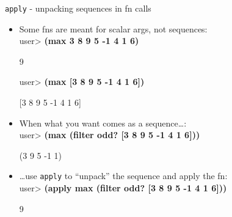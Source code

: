 \documentclass{beamer}
\begin{document}
\begin{frame}{\texttt{apply} - unpacking sequences in fn calls}
  \begin{itemize}
  \item Some fns are meant for scalar args, not sequences:\\
{\ttfamily\color{black}
%
\textcolor[rgb]{0.49803922,0.0,0.49803922}{user{\textgreater}
}\textbf{(max 3 8 9 5 -1 4 1 6)}}

{\ttfamily\color{black}
9}

{\ttfamily\color{black}
\textcolor[rgb]{0.49803922,0.0,0.49803922}{user{\textgreater}
}\textbf{(max [3 8 9 5 -1 4 1 6])}}

{\ttfamily\color{black}
[3 8 9 5 -1 4 1 6]}
  \item When what you want comes as a sequence\ldots:\\
{\ttfamily\color{black}
\textcolor[rgb]{0.49803922,0.0,0.49803922}{user{\textgreater}
}\textbf{(max (filter odd? [3 8 9 5 -1 4 1 6]))}}

{\ttfamily\color{black}
(3 9 5 -1 1)}
  \item \ldots use \texttt{apply} to ``unpack'' the sequence and apply the
    fn:\\

{\ttfamily\color{black}
\textcolor[rgb]{0.49803922,0.0,0.49803922}{user{\textgreater}
}\textbf{(apply max (filter odd? [3 8 9 5 -1 4 1 6]))}}

{\ttfamily\color{black}
9}
  \end{itemize}
\end{frame}
\end{document}
